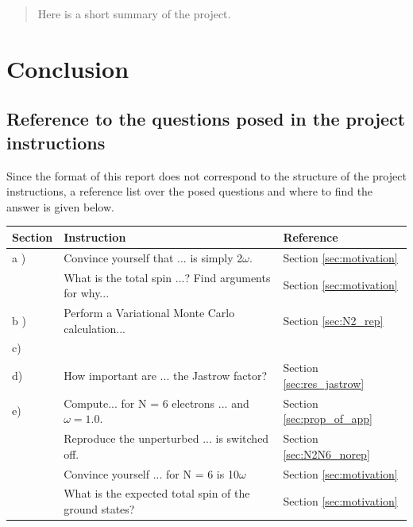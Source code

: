 \documentclass[a4paper,10pt,english]{article}
\numberwithin{figure}{subsection}
\numberwithin{table}{subsection}
\numberwithin{equation}{subsection}
\begin{document}
\begin{abstract}
Here is a short summary of the project.
\end{abstract}

\hypersetup{linkcolor=black}
\tableofcontents 
\hypersetup{linkcolor=red}
\clearpage









\section{Conclusion}

\clearpage
{}


\clearpage
\begin{appendices}

\section{Reference to the questions posed in the project instructions}

Since the format of this report does not correspond to the structure of the project instructions, a reference list over the posed questions and where to find the answer is given below. 


\begin{table}[h!]
        \begin{tabular}{lll}
        \toprule
        Section         & Instruction           & Reference \\
        \midrule
        a )             & Convince yourself that ... is simply 2$\omega$. & Section \ref{sec:motivation} \\
                        & What is the total spin ...? Find arguments for why... & Section \ref{sec:motivation} \\
        \midrule
        b )             & Perform a Variational Monte Carlo calculation...    & Section \ref{sec:N2_rep}\\
        \midrule
        c) \\
        \midrule 
        d)  &  How important are ... the Jastrow factor? & Section \ref{sec:res_jastrow}\\
        \midrule
        e) & Compute...  for N = 6 electrons ...  and $\omega = 1.0$. & Section \ref{sec:prop_of_app} \\ 
         &  Reproduce the unperturbed ... is switched off.  & Section \ref{sec:N2N6_norep} \\
         &      Convince yourself ... for N = 6 is 10$\omega$ & Section \ref{sec:motivation} \\
         & What is the expected total spin of the ground states? & Section \ref{sec:motivation} \\


\end{tabular}
\end{table}
\end{appendices}
\end{document}
